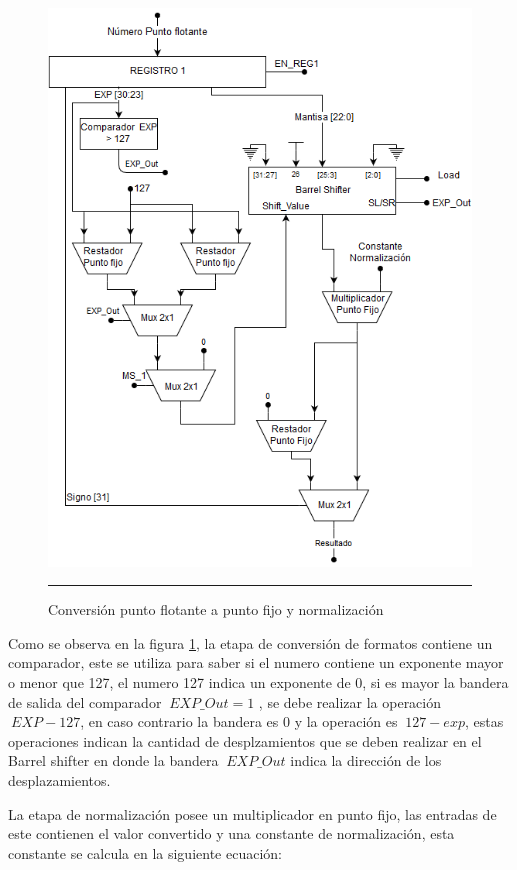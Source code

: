   \begin{figure}[H]
  \centering
    \includegraphics[scale=0.6]{./NORMALIZADOR.png}
    \rule{35em}{0.5pt}
  \caption[Normalizador]{Conversión punto flotante a punto fijo y normalización  }
  \label{fig:NORM}
\end{figure} 

Como se observa en la figura \ref{fig:NORM}, la etapa de conversión de formatos contiene un comparador, este se utiliza para saber si el numero contiene un exponente mayor o menor que 127, el numero 127 indica un exponente de 0, si es mayor la bandera de salida del comparador $\ EXP\_Out = 1$ , se debe realizar la operación $\ EXP - 127$, en caso contrario la bandera es 0 y la operación es $\ 127 - exp$, estas operaciones indican la cantidad de desplzamientos que se deben realizar en el Barrel shifter en donde la bandera $\ EXP\_Out $ indica la dirección de los desplazamientos. 

La etapa de normalización posee un multiplicador en punto fijo, las entradas de este contienen el valor convertido y una constante de normalización, esta constante se calcula en la siguiente ecuación: 
      

